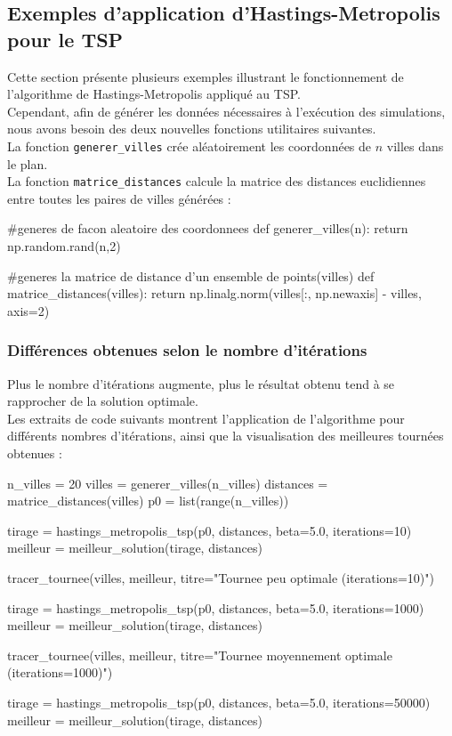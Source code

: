 \documentclass{article}
\begin{document}
\subsection{Exemples d'application d'Hastings-Metropolis pour le TSP}

Cette section présente plusieurs exemples illustrant le fonctionnement de l'algorithme de Hastings-Metropolis appliqué au TSP. \\

Cependant, afin de générer les données nécessaires à l'exécution des simulations, nous avons besoin des deux nouvelles fonctions utilitaires suivantes. \\
La fonction \texttt{generer\_villes} crée aléatoirement les coordonnées de $n$ villes dans le plan. \\
La fonction \texttt{matrice\_distances} calcule la matrice des distances euclidiennes entre toutes les paires de villes générées :

\begin{python}

#generes de facon aleatoire des coordonnees 
def generer_villes(n):
    return np.random.rand(n,2)

#generes la matrice de distance d'un ensemble de points(villes) 
def matrice_distances(villes):
    return np.linalg.norm(villes[:, np.newaxis] - villes, axis=2)

\end{python}

\subsubsection{Différences obtenues selon le nombre d'itérations}

Plus le nombre d'itérations augmente, plus le résultat obtenu tend à se rapprocher de la solution optimale. \\
Les extraits de code suivants montrent l'application de l'algorithme pour différents nombres d'itérations, ainsi que la visualisation des meilleures tournées obtenues :

\begin{python}
n_villes = 20
villes = generer_villes(n_villes)
distances = matrice_distances(villes)
p0 = list(range(n_villes))


tirage = hastings_metropolis_tsp(p0, distances, beta=5.0, iterations=10)
meilleur = meilleur_solution(tirage, distances)

tracer_tournee(villes, meilleur, titre="Tournee peu optimale (iterations=10)")

tirage = hastings_metropolis_tsp(p0, distances, beta=5.0, iterations=1000)
meilleur = meilleur_solution(tirage, distances)

tracer_tournee(villes, meilleur, titre="Tournee moyennement optimale (iterations=1000)")

tirage = hastings_metropolis_tsp(p0, distances, beta=5.0, iterations=50000)
meilleur = meilleur_solution(tirage, distances)
\end{python}
\end{document}

